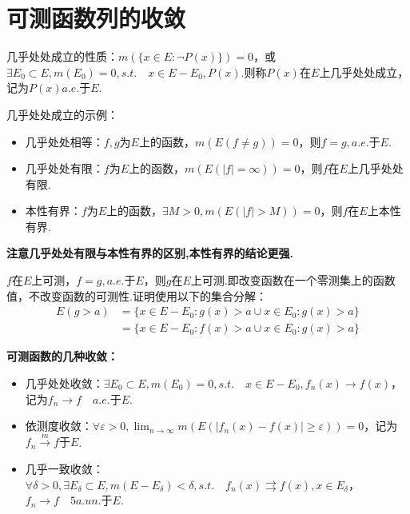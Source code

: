 \documentclass[bwprint, withoutpreface]{cumcmthesis}
\begin{document}
\section{可测函数列的收敛}

\indent 几乎处处成立的性质：$m(\{x \in E: \neg P(x)\}) = 0$，或$\exists E_0 \subset E, m(E_0) = 0, s.t. \quad x \in E - E_0, P(x)$.则称$P(x)$在$E$上几乎处处成立，记为$P(x) a.e. \mbox{于} E$.

几乎处处成立的示例：
\begin{itemize}[itemindent=2em]
	\item 几乎处处相等：$f, g$为$E$上的函数，$m(E(f \neq g)) = 0$，则$f = g, a.e.\mbox{于}E$.
	\item 几乎处处有限：$f$为$E$上的函数，$m(E(|f| = \infty)) = 0$，则$f$在$E$上几乎处处有限.
	\item 本性有界：$f$为$E$上的函数，$\exists M > 0, m(E(|f| > M)) = 0$，则$f$在$E$上本性有界.
\end{itemize}	

\textbf{注意几乎处处有限与本性有界的区别,本性有界的结论更强.}

$f$在$E$上可测，$f = g, a.e.\mbox{于}E$，则$g$在$E$上可测.即改变函数在一个零测集上的函数值，不改变函数的可测性.证明使用以下的集合分解：
\begin{align*}
	E(g > a) & = {\{x \in E - E_0: g(x) > a} \cup {x \in E_0: g(x) > a\}} \\
			 & = {\{x \in E - E_0: f(x) > a} \cup {x \in E_0: g(x) > a\}}
\end{align*}

\textbf{可测函数的几种收敛：}
\begin{itemize}[itemindent=2em]
	\item 几乎处处收敛：$\exists E_0 \subset E, m(E_0) = 0, s.t. \quad x \in E - E_0, f_n(x) \to f(x)$，记为$f_n \to f \quad a.e. \mbox{于}E$.
	\item 依测度收敛：$\forall \varepsilon > 0, \lim_{n \to \infty}{m(E(|f_n(x) - f(x)| \geqslant \varepsilon))} = 0$，记为$f_n \stackrel{m}{\longrightarrow} f\mbox{于}E$.
	\item 几乎一致收敛：$\forall \delta > 0, \exists E_{\delta} \subset E, m(E - E_{\delta}) < \delta, s.t. \quad f_n(x) \rightrightarrows f(x), x \in E_{\delta}$，$f_n \to f \quad 5a.un. \mbox{于}E$.
\end{itemize}
\end{document}
